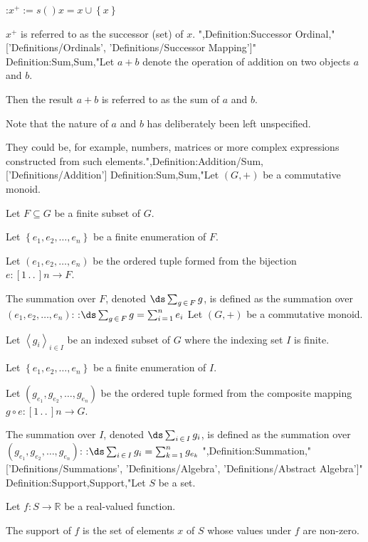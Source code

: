 :$x^+ := s \left(   \right)x = x \cup \left\lbrace x \right\rbrace$

$x^+$ is referred to as the successor (set) of $x$.
",Definition:Successor Ordinal,"['Definitions/Ordinals', 'Definitions/Successor Mapping']"
Definition:Sum,Sum,"Let $a + b$ denote the operation of addition on two objects $a$ and $b$.

Then the result $a + b$ is referred to as the sum of $a$ and $b$.


Note that the nature of $a$ and $b$ has deliberately been left unspecified.

They could be, for example, numbers, matrices or more complex expressions constructed from such elements.",Definition:Addition/Sum,['Definitions/Addition']
Definition:Sum,Sum,"Let $\left( G, + \right)$ be a commutative monoid.


Let $F \subseteq G$ be a finite subset of $G$.


Let $\left\lbrace e_1, e_2, \ldots, e_n \right\rbrace$ be a finite enumeration of $F$.

Let $\left( e_1, e_2, \ldots, e_n \right)$ be the ordered tuple formed from the bijection $e: \left[ 1 \,.\,.\,   \right]n \to F$.


The summation over $F$, denoted $\ds \sum_{g \mathop \in F} g$, is defined as the summation over $\left( e_1, e_2, \ldots, e_n \right)$:
:$\ds \sum_{g \mathop \in F} g = \sum_{i \mathop = 1}^n e_i$
Let $\left( G, + \right)$ be a commutative monoid.


Let $\left\langle g_i \right\rangle_{i \mathop \in I}$ be an indexed subset of $G$ where the indexing set $I$ is finite.


Let $\left\lbrace e_1, e_2, \ldots, e_n \right\rbrace$ be a finite enumeration of $I$.

Let $\left( g_{e_1}, g_{e_2}, \ldots, g_{e_n}  \right)$ be the ordered tuple formed from the composite mapping $g \circ e: \left[ 1 \,.\,.\,   \right]n \to G$.


The summation over $I$, denoted $\ds \sum_{i \mathop \in I} g_i$, is defined as the summation over $\left( g_{e_1}, g_{e_2}, \ldots, g_{e_n}  \right)$:
:$\ds \sum_{i \mathop \in I} g_i = \sum_{k \mathop = 1}^n g_{e_k}$
",Definition:Summation,"['Definitions/Summations', 'Definitions/Algebra', 'Definitions/Abstract Algebra']"
Definition:Support,Support,"Let $S$ be a set.

Let $f: S \to \mathbb R$ be a real-valued function.


The support of $f$ is the set of elements $x$ of $S$ whose values under $f$ are non-zero.

